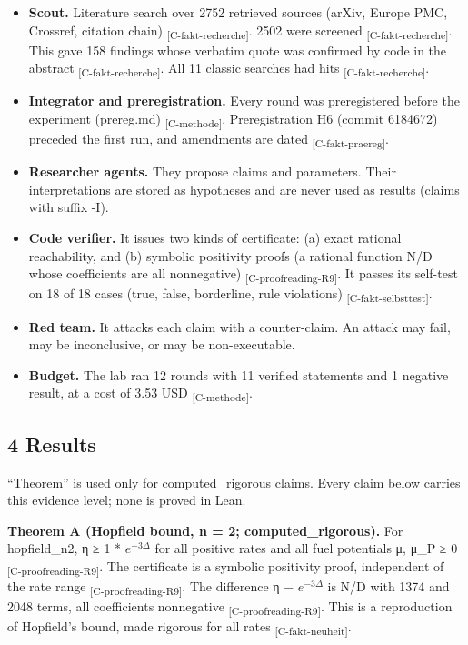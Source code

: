 \documentclass[
  english,
  twocolumn,
  10pt]{article}
\providecommand{\tightlist}{%
  \setlength{\itemsep}{0pt}\setlength{\parskip}{0pt}}
\begin{document}
\begin{itemize}
\tightlist
\item
  \textbf{Scout.} Literature search over 2752 retrieved sources (arXiv,
  Europe PMC, Crossref, citation chain)
  \textsubscript{[C-fakt-recherche]}. 2502 were screened
  \textsubscript{[C-fakt-recherche]}. This gave 158 findings whose
  verbatim quote was confirmed by code in the abstract
  \textsubscript{[C-fakt-recherche]}. All 11 classic searches had hits
  \textsubscript{[C-fakt-recherche]}.
\item
  \textbf{Integrator and preregistration.} Every round was preregistered
  before the experiment (prereg.md) \textsubscript{[C-methode]}.
  Preregistration H6 (commit 6184672) preceded the first run, and
  amendments are dated \textsubscript{[C-fakt-praereg]}.
\item
  \textbf{Researcher agents.} They propose claims and parameters. Their
  interpretations are stored as hypotheses and are never used as results
  (claims with suffix -I).
\item
  \textbf{Code verifier.} It issues two kinds of certificate: (a) exact
  rational reachability, and (b) symbolic positivity proofs (a rational
  function N/D whose coefficients are all nonnegative)
  \textsubscript{[C-proofreading-R9]}. It passes its self-test on 18 of
  18 cases (true, false, borderline, rule violations)
  \textsubscript{[C-fakt-selbsttest]}.
\item
  \textbf{Red team.} It attacks each claim with a counter-claim. An
  attack may fail, may be inconclusive, or may be non-executable.
\item
  \textbf{Budget.} The lab ran 12 rounds with 11 verified statements and
  1 negative result, at a cost of 3.53 USD \textsubscript{[C-methode]}.
\end{itemize}

\subsection{4 Results}\label{results}

``Theorem'' is used only for computed\_rigorous claims. Every claim
below carries this evidence level; none is proved in Lean.

\textbf{Theorem A (Hopfield bound, n = 2; computed\_rigorous).} For
hopfield\_n2, η ≥ 1 * \(e^{-3\Delta}\) for all positive rates and all
fuel potentials μ, μ\_P ≥ 0 \textsubscript{[C-proofreading-R9]}. The
certificate is a symbolic positivity proof, independent of the rate
range \textsubscript{[C-proofreading-R9]}. The difference η −
\(e^{-3\Delta}\) is N/D with 1374 and 2048 terms, all coefficients
nonnegative \textsubscript{[C-proofreading-R9]}. This is a reproduction
of Hopfield's bound, made rigorous for all rates
\textsubscript{[C-fakt-neuheit]}.
\end{document}

